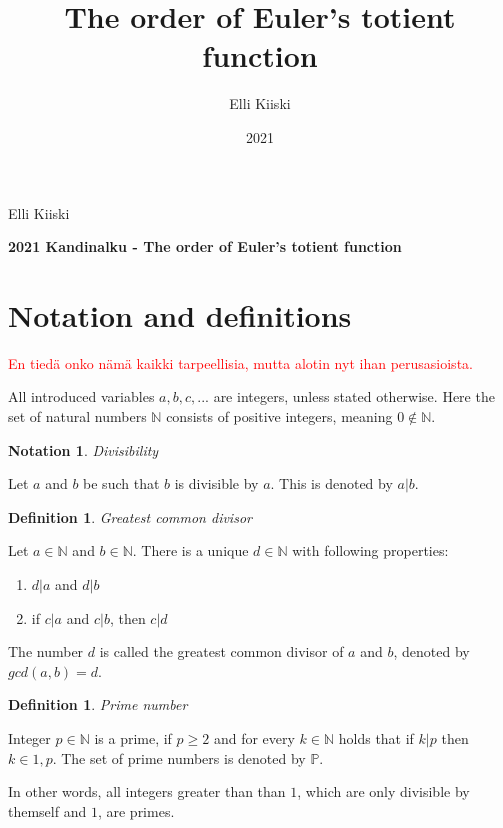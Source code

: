 \documentclass{article}
\title{The order of Euler's totient function}
\author{Elli Kiiski}
\date{2021}
\theoremstyle{definition}
\newtheorem{definition}[subsubsection]{Definition}
\newtheorem{notation}[subsubsection]{Notation}
\begin{document}
{\large
Elli Kiiski
\par
\textbf{2021 Kandinalku - The order of Euler's totient function}
}
\vspace{0.5cm}

\section{Notation and definitions}

\textcolor{red}{En tiedä onko nämä kaikki tarpeellisia, mutta alotin nyt ihan perusasioista.}

All introduced variables $a, b, c, ...$ are integers, unless stated otherwise. Here the set of natural numbers $\mathbb{N}$ consists of positive integers, meaning $0 \not\in \mathbb{N}$.

\begin{notation}{\emph{Divisibility}}

Let $a$ and $b$ be such that $b$ is divisible by $a$. This is denoted by $a \vert b$.

\end{notation}

\begin{definition}{\emph{Greatest common divisor}}

Let $a \in \mathbb{N}$ and $b \in \mathbb{N}$. There is a unique $d \in \mathbb{N}$ with following properties:

\begin{enumerate}
 \item $d \vert a$ and $d \vert b$
 \item if $c \vert a$ and $c \vert b$, then $c \vert d$
\end{enumerate}

The number $d$ is called the greatest common divisor of $a$ and $b$, denoted by $gcd(a,b) = d$.

\end{definition}

\begin{definition}{\emph{Prime number}}

Integer $p\in\mathbb{N}$ is a prime, if $p \geq 2$ and for every $k\in\mathbb{N}$ holds that if $k \vert p$ then $k\in{1, p}$. The set of prime numbers is denoted by $\mathbb{P}$.

In other words, all integers greater than than $1$, which are only divisible by themself and $1$, are primes.


\end{definition}
\end{document}

